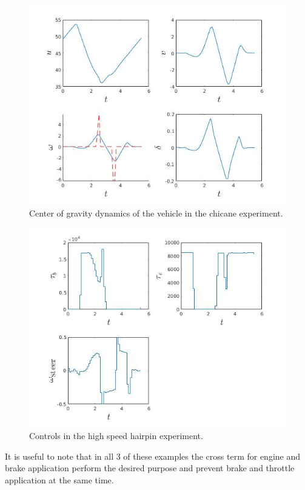 \documentclass[conference,11pt]{IEEEtran}
\begin{document}
\begin{figure}[t]
  \centering
  \includegraphics[scale=0.5]{chicane_cg.jpg}
  \caption{Center of gravity dynamics of the vehicle in the chicane experiment.}
  \label{fig:chicane_cg}
\end{figure}
\begin{figure}[b]
  \centering
  \includegraphics[scale=0.5]{chicane_u.jpg}
  \caption{Controls in the high speed hairpin experiment.}
  \label{fig:chicane_u}
\end{figure}

It is useful to note that in all 3 of these examples the cross term for engine and brake application perform the desired purpose and prevent brake and throttle application at the same time.
\end{document}
